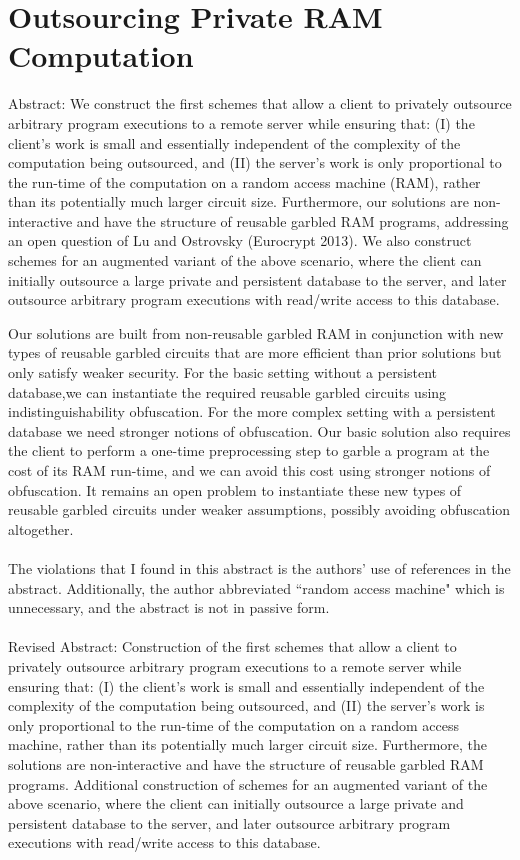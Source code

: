 \documentclass{article}
\begin{document}
\section{Outsourcing Private RAM Computation}
Abstract: We construct the first schemes that allow a client to privately outsource arbitrary program executions to a remote server while ensuring that: (I) the client's work is small and essentially independent of the complexity of the computation being outsourced, and (II) the server's work is only proportional to the run-time of the computation on a random access machine (RAM), rather than its potentially much larger circuit size. Furthermore, our solutions are non-interactive and have the structure of reusable garbled RAM programs, addressing an open question of Lu and Ostrovsky (Eurocrypt 2013). We also construct schemes for an augmented variant of the above scenario, where the client can initially outsource a large private and persistent database to the server, and later outsource arbitrary program executions with read/write access to this database.

Our solutions are built from non-reusable garbled RAM in conjunction with new types of reusable garbled circuits that are more efficient than prior solutions but only satisfy weaker security. For the basic setting without a persistent database,we can instantiate the required reusable garbled circuits using indistinguishability obfuscation. For the more complex setting with a persistent database we need stronger notions of obfuscation. Our basic solution also requires the client to perform a one-time preprocessing step to garble a program at the cost of its RAM run-time, and we can avoid this cost using stronger notions of obfuscation. It remains an open problem to instantiate these new types of reusable garbled circuits under weaker assumptions, possibly avoiding obfuscation altogether.
\\
\\
The violations that I found in this abstract is the authors' use of references in the abstract. Additionally, the author abbreviated ``random access machine" which is unnecessary, and the abstract is not in passive form. 
\\
\\
Revised Abstract:
Construction of the first schemes that allow a client to privately outsource arbitrary program executions to a remote server while ensuring that: (I) the client's work is small and essentially independent of the complexity of the computation being outsourced, and (II) the server's work is only proportional to the run-time of the computation on a random access machine, rather than its potentially much larger circuit size. Furthermore, the solutions are non-interactive and have the structure of reusable garbled RAM programs. Additional construction of schemes for an augmented variant of the above scenario, where the client can initially outsource a large private and persistent database to the server, and later outsource arbitrary program executions with read/write access to this database.
\end{document}
